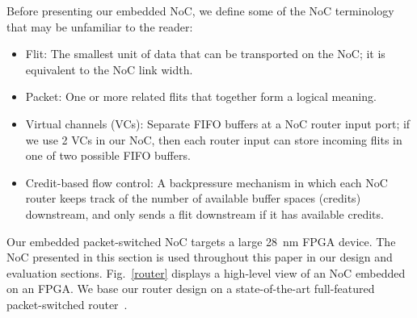 %
%
%
%

Before presenting our embedded NoC, we define some of the NoC terminology~\cite{dally_book} that may be unfamiliar to the reader:
\begin{itemize}
\setlength\itemsep{-0.33mm}
\item Flit: The smallest unit of data that can be transported on the NoC; it is equivalent to the NoC link width.
\item Packet: One or more related flits that together form a logical meaning.
\item Virtual channels (VCs): Separate FIFO buffers at a NoC router input port; if we use 2 VCs in our NoC, then each router input can store incoming flits in one of two possible FIFO buffers.
\item Credit-based flow control: A backpressure mechanism in which each NoC router keeps track of the number of available buffer spaces (credits) downstream, and only sends a flit downstream if it has available credits.
\end{itemize}

Our embedded packet-switched NoC targets a large 28~nm FPGA device.
The NoC presented in this section is used throughout this paper in our design and evaluation sections.
Fig.~\ref{router} displays a high-level view of an NoC embedded on an FPGA.
We base our router design on a state-of-the-art full-featured packet-switched router~\cite{becker_router}.

